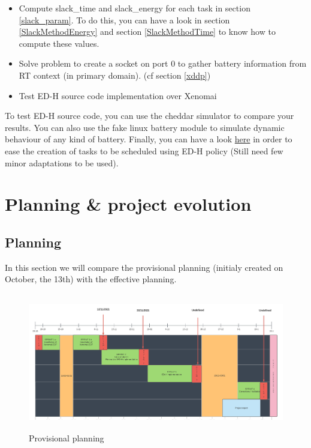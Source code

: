 \documentclass[12pt,hidelinks]{article}
\begin{document}
{\begin{itemize}
	    \item Compute slack\_time and slack\_energy for each task in section \ref{slack_param}. To do this, you can have a look in section \ref{SlackMethodEnergy} and section \ref{SlackMethodTime} to know how to compute these values.
 	    
 	    \item Solve problem to create a socket on port 0 to gather battery information from RT context (in primary domain). (cf  section \ref{xddp})
 	    
	    \item Test ED-H source code implementation over Xenomai
	    
	\end{itemize}
	
	To test ED-H source code, you can use the cheddar simulator to compare your results. You can also use the fake linux battery module to simulate dynamic behaviour of any kind of battery. Finally, you can have a look \href{https://github.com/skyultime/M2_ERTS_Project_xenomai_edh/tree/dev/Tests/EDHonXenomai/edhAsserts}{here} in order to ease the creation of tasks to be scheduled using ED-H policy (Still need few minor adaptations to be used).
	
	\newpage
\newpage
\section{Planning \& project evolution}
\vspace{4cm}
	\subsection{Planning}
	
	In this section we will compare the provisional planning (initialy created on October, the 13th) with the effective planning.
	
     \begin{figure}[!h]
        \hspace{-2cm}
        \includegraphics[width=20cm,height=6cm]{provisionalPlanning.png}
        \caption{Provisional planning}
    \end{figure} \newline
    
}
\end{document}
